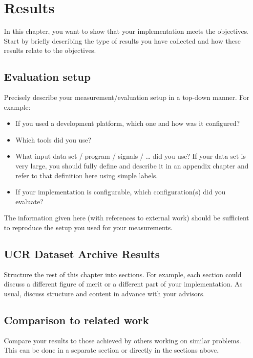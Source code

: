 \chapter{Results}
\label{ch:results}

\usepackage{csvsimple}
In this chapter, you want to show that your implementation meets the objectives.
Start by briefly describing the type of results you have collected and how these results relate to the objectives.

\section{Evaluation setup}

Precisely describe your measurement/evaluation setup in a top-down manner.
For example:
\begin{itemize}
  \item If you used a development platform, which one and how was it configured?
  \item Which tools did you use?
  \item What input data set / program / signals / \ldots{} did you use?
    If your data set is very large, you should fully define and describe it in an appendix chapter and refer to that definition here using simple labels.
  \item If your implementation is configurable, which configuration(s) did you evaluate?
\end{itemize}

The information given here (with references to external work) should be sufficient to reproduce the setup you used for your measurements.

\section{UCR Dataset Archive Results}



Structure the rest of this chapter into sections.
For example, each section could discuss a different figure of merit or a different part of your implementation.
As usual, discuss structure and content in advance with your advisors.

\section{Comparison to related work}

Compare your results to those achieved by others working on similar problems.
This can be done in a separate section or directly in the sections above.


